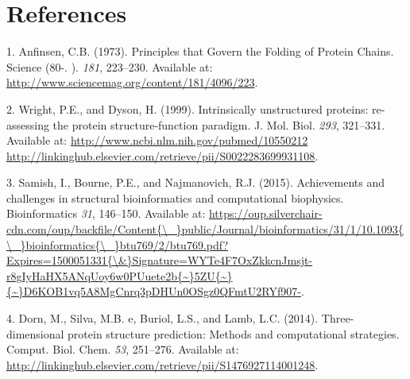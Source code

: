 \documentclass[12pt,a4paper,twoside]{book}
\theoremstyle{definition}
\theoremstyle{definition}
\theoremstyle{remark}
\begin{document}
\backmatter

\listoffigures
{}

\listoftables
{}

\chapter*{References}\label{references}

\hypertarget{refs}{}
\hypertarget{ref-Anfinsen1973}{}
1. Anfinsen, C.B. (1973). Principles that Govern the Folding of Protein
Chains. Science (80-. ). \emph{181}, 223--230. Available at:
\url{http://www.sciencemag.org/content/181/4096/223}.

\hypertarget{ref-Wright1999}{}
2. Wright, P.E., and Dyson, H. (1999). Intrinsically unstructured
proteins: re-assessing the protein structure-function paradigm. J. Mol.
Biol. \emph{293}, 321--331. Available at:
\href{http://www.ncbi.nlm.nih.gov/pubmed/10550212\%20http://linkinghub.elsevier.com/retrieve/pii/S0022283699931108}{http://www.ncbi.nlm.nih.gov/pubmed/10550212 http://linkinghub.elsevier.com/retrieve/pii/S0022283699931108}.

\hypertarget{ref-Samish2015}{}
3. Samish, I., Bourne, P.E., and Najmanovich, R.J. (2015). Achievements
and challenges in structural bioinformatics and computational
biophysics. Bioinformatics \emph{31}, 146--150. Available at:
\href{https://oup.silverchair-cdn.com/oup/backfile/Content\%7B/_\%7Dpublic/Journal/bioinformatics/31/1/10.1093\%7B/_\%7Dbioinformatics\%7B/_\%7Dbtu769/2/btu769.pdf?Expires=1500051331\%7B/\&\%7DSignature=WYTe4F7OxZkkcnJmsjt-r8gIyHaHX5ANqUoy6w0PUuete2b\%7B~\%7D5ZU\%7B~\%7D\%7B~\%7DD6KOB1vq5A8MgCnrq3pDHUn0OSgz0QFmtU2RYf907-}{https://oup.silverchair-cdn.com/oup/backfile/Content\{\textbackslash{}\_\}public/Journal/bioinformatics/31/1/10.1093\{\textbackslash{}\_\}bioinformatics\{\textbackslash{}\_\}btu769/2/btu769.pdf?Expires=1500051331\{\textbackslash{}\&\}Signature=WYTe4F7OxZkkcnJmsjt-r8gIyHaHX5ANqUoy6w0PUuete2b\{\textasciitilde{}\}5ZU\{\textasciitilde{}\}\{\textasciitilde{}\}D6KOB1vq5A8MgCnrq3pDHUn0OSgz0QFmtU2RYf907-}.

\hypertarget{ref-Dorn2014}{}
4. Dorn, M., Silva, M.B. e, Buriol, L.S., and Lamb, L.C. (2014).
Three-dimensional protein structure prediction: Methods and
computational strategies. Comput. Biol. Chem. \emph{53}, 251--276.
Available at:
\url{http://linkinghub.elsevier.com/retrieve/pii/S1476927114001248}.
\end{document}
